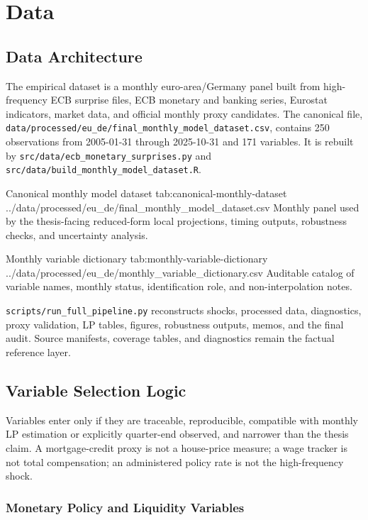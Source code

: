 \chapter{Data}
\label{chap:data}

\section{Data Architecture}

The empirical dataset is a monthly euro-area/Germany panel built from high-frequency ECB surprise files, ECB monetary and banking series, Eurostat indicators, market data, and official monthly proxy candidates. The canonical file, \nolinkurl{data/processed/eu_de/final_monthly_model_dataset.csv}, contains 250 observations from 2005-01-31 through 2025-10-31 and 171 variables. It is rebuilt by \nolinkurl{src/data/ecb_monetary_surprises.py} and \nolinkurl{src/data/build_monthly_model_dataset.R}.

\artifacttable
  {Canonical monthly model dataset}
  {tab:canonical-monthly-dataset}
  {../data/processed/eu_de/final_monthly_model_dataset.csv}
  {Monthly panel used by the thesis-facing reduced-form local projections, timing outputs, robustness checks, and uncertainty analysis.}

\artifacttable
  {Monthly variable dictionary}
  {tab:monthly-variable-dictionary}
  {../data/processed/eu_de/monthly_variable_dictionary.csv}
  {Auditable catalog of variable names, monthly status, identification role, and non-interpolation notes.}

\nolinkurl{scripts/run_full_pipeline.py} reconstructs shocks, processed data, diagnostics, proxy validation, LP tables, figures, robustness outputs, memos, and the final audit. Source manifests, coverage tables, and diagnostics remain the factual reference layer.

\section{Variable Selection Logic}

Variables enter only if they are traceable, reproducible, compatible with monthly LP estimation or explicitly quarter-end observed, and narrower than the thesis claim. A mortgage-credit proxy is not a house-price measure; a wage tracker is not total compensation; an administered policy rate is not the high-frequency shock.

\subsection{Monetary Policy and Liquidity Variables}

